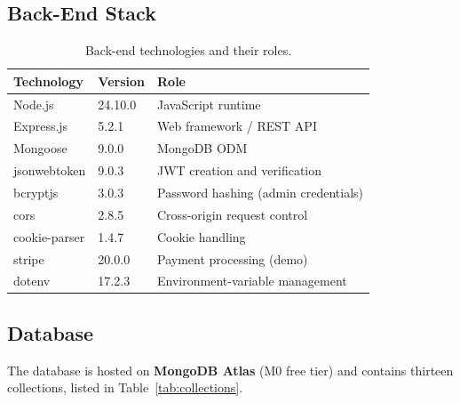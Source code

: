 \documentclass[12pt,a4paper]{report}
\begin{document}
\subsection{Back-End Stack}
\begin{table}[H]
\centering
\caption{Back-end technologies and their roles.}
\label{tab:backend}
\small
\begin{tabularx}{\textwidth}{l l X}
\toprule
\textbf{Technology} & \textbf{Version} & \textbf{Role} \\
\midrule
Node.js          & 24.10.0  & JavaScript runtime \\
Express.js       & 5.2.1    & Web framework / REST API \\
Mongoose         & 9.0.0    & MongoDB ODM \\
jsonwebtoken     & 9.0.3    & JWT creation and verification \\
bcryptjs         & 3.0.3    & Password hashing (admin credentials) \\
cors             & 2.8.5    & Cross-origin request control \\
cookie-parser    & 1.4.7    & Cookie handling \\
stripe           & 20.0.0   & Payment processing (demo) \\
dotenv           & 17.2.3   & Environment-variable management \\
\bottomrule
\end{tabularx}
\end{table}

\subsection{Database}
The database is hosted on \textbf{MongoDB Atlas} (M0 free tier) and contains
thirteen collections, listed in Table~\ref{tab:collections}.
\end{document}
